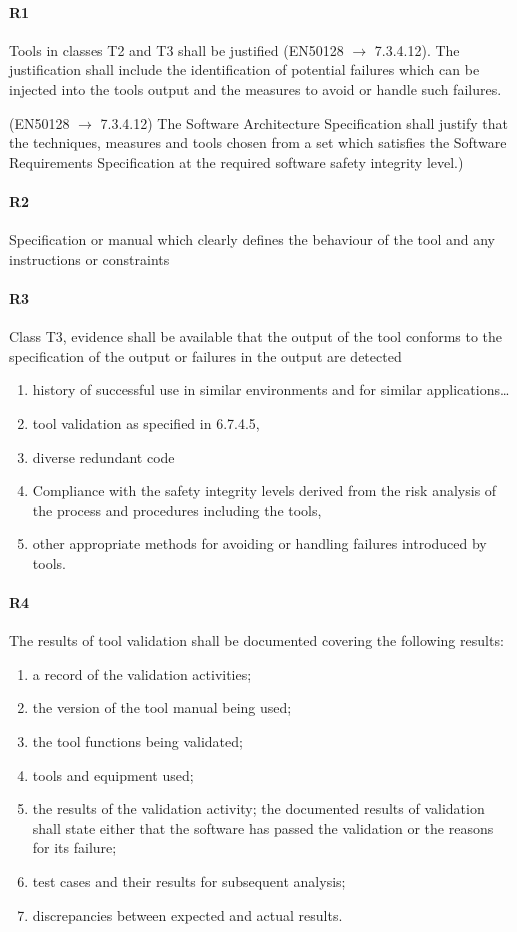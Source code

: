 \documentclass{template/openetcs_article}
\begin{document}
\paragraph{R1}
Tools in classes T2 and T3 shall be justified (EN50128 $\rightarrow$ 7.3.4.12). The justification shall include the identification of potential failures which can be injected into the tools output and the measures to avoid or handle such failures.


(EN50128 $\rightarrow$ 7.3.4.12) The Software Architecture Specification shall justify that the techniques, measures and tools chosen from a set which satisfies the Software Requirements Specification at the required software safety integrity level.)

\paragraph{R2}
Specification or manual which clearly defines the behaviour of the tool and any instructions or constraints

\paragraph{R3}
Class T3, evidence shall be available that the output of the tool conforms to the specification of the output or failures in the output are detected
\begin{enumerate}
\item history of successful use in similar environments and for similar applications{\dots} 
\item tool validation as specified in 6.7.4.5, 
\item diverse redundant code 
\item Compliance with the safety integrity levels derived from the risk analysis of the process and procedures including the tools, 
\item other appropriate methods for avoiding or handling failures introduced by tools.
\end{enumerate}


\paragraph{R4}
The results of tool validation shall be documented covering the following results:
\begin{enumerate}
\item a record of the validation activities; 
\item the version of the tool manual being used; 
\item the tool functions being validated;
\item tools and equipment used; 
\item the results of the validation activity; the documented results of validation shall state either that the software has passed the validation or the reasons for its failure; 
\item test cases and their results for subsequent analysis; 
\item discrepancies between expected and actual results.
\end{enumerate}
\end{document}
